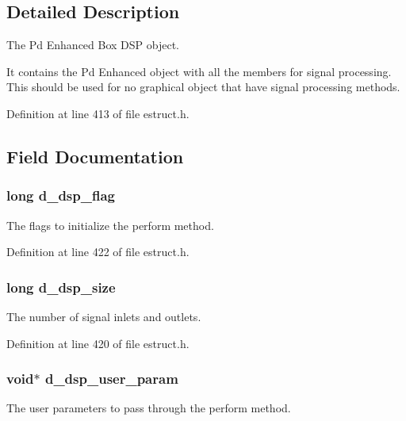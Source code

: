 \subsection{Detailed Description}
The Pd Enhanced Box D\-S\-P object. 

It contains the Pd Enhanced object with all the members for signal processing. This should be used for no graphical object that have signal processing methods. 

Definition at line 413 of file estruct.\-h.



\subsection{Field Documentation}
\hypertarget{struct__edspobj_af3409f354253e5753dbba6b22472972e}{
\subsubsection[{d\-\_\-dsp\-\_\-flag}]{\setlength{\rightskip}{0pt plus 5cm}long d\-\_\-dsp\-\_\-flag}}\label{struct__edspobj_af3409f354253e5753dbba6b22472972e}
The flags to initialize the perform method. 

Definition at line 422 of file estruct.\-h.

\hypertarget{struct__edspobj_a0bb016ebe02ce3d3a0965a19c1d8476d}{
\subsubsection[{d\-\_\-dsp\-\_\-size}]{\setlength{\rightskip}{0pt plus 5cm}long d\-\_\-dsp\-\_\-size}}\label{struct__edspobj_a0bb016ebe02ce3d3a0965a19c1d8476d}
The number of signal inlets and outlets. 

Definition at line 420 of file estruct.\-h.

\hypertarget{struct__edspobj_ab056760f93f95b4edc3a8dddd0b5b62f}{
\subsubsection[{d\-\_\-dsp\-\_\-user\-\_\-param}]{\setlength{\rightskip}{0pt plus 5cm}void$\ast$ d\-\_\-dsp\-\_\-user\-\_\-param}}\label{struct__edspobj_ab056760f93f95b4edc3a8dddd0b5b62f}
The user parameters to pass through the perform method. 

